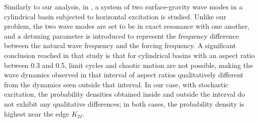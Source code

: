 Similarly to our analysis, in \citet{miles84:_reson}, a system of two surface-gravity wave modes in a cylindrical basin subjected to horizontal excitation is studied. Unlike our problem, the two wave modes are set to be in exact resonance with one another, and a detuning parameter is introduced to represent the frequency difference between the natural wave frequency and the forcing frequency. A significant conclusion reached in that study is that for cylindrical basins with an aspect ratio between 0.3 and 0.5, limit cycles and chaotic motion are not possible, making the wave dynamics observed in that interval of aspect ratios qualitatively different from the dynamics seen outside that interval. In our case, with stochastic excitation, the probability densities obtained inside and outside the interval do not exhibit any qualitative differences; in both cases, the probability density is highest near the edge $K_{2I}$.
